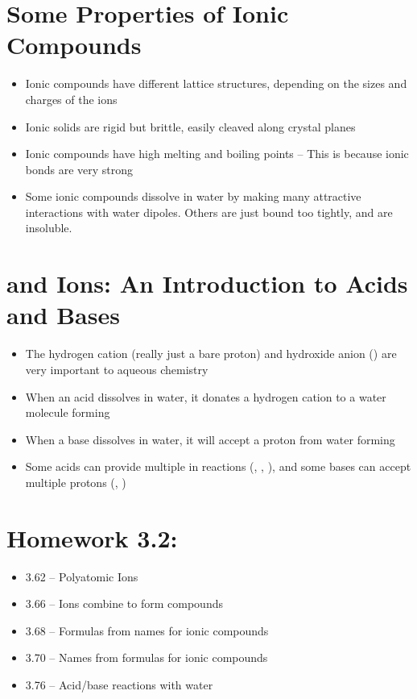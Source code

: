\documentclass[12pt, openany, letterpaper]{memoir}
\begin{document}
\section{Some Properties of Ionic Compounds}
\begin{itemize}
	\item Ionic compounds have different lattice structures, depending on the sizes and charges of the ions
	\item Ionic solids are rigid but brittle, easily cleaved along crystal planes
	\item Ionic compounds have high melting and boiling points -- This is because ionic bonds are very strong
	\item Some ionic compounds dissolve in water by making many attractive interactions with water dipoles. Others are just bound too tightly, and are insoluble.
\end{itemize}

\section{ and  Ions: An Introduction to Acids and Bases}
\begin{itemize}
	\item The hydrogen cation (really just a bare proton) and hydroxide anion () are very important to aqueous chemistry
	\item When an acid dissolves in water, it donates a hydrogen cation to a water molecule forming 
	\item When a base dissolves in water, it will accept a proton from water forming 
	\item Some acids can provide multiple  in reactions (, , ), and some bases can accept multiple protons (, )
\end{itemize}

\section*{Homework 3.2:}
\begin{itemize}
  \item 3.62 -- Polyatomic Ions
  \item 3.66 -- Ions combine to form compounds
  \item 3.68 -- Formulas from names for ionic compounds
  \item 3.70 -- Names from formulas for ionic compounds
  \item 3.76 -- Acid/base reactions with water
\end{itemize}
\end{document}
